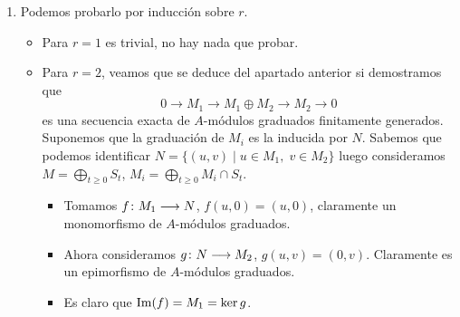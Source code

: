 \documentclass[twoside]{article}
\begin{document}
\begin{solucion}
\begin{enumerate}
\begin{proof} Veamos que se verifican las propiedades.
\begin{itemize} 
\item $P_t,N_t$ y $M_t$ son $k$-e.v. de dimensión finita por el Lema \ref{lemma:1}.
\item Las restricciones de $f$ y $g$ a $M_t$ y $N_t$ respectivamente están bien definidas por la hipótesis de que son homomorfismos de $A$-módulos graduados (Ecuación \ref{eq:1}).
\item $f,g$ son homomorfismos de $k$-e.v. por ser homomorfismos de $A$-módulos, luego las restricciones también lo son. Además, $f$ es inyectiva por hipótesis, por lo que $f|_{M_t}$ también lo es. $g|_{N_t}$ es sobreyectiva por el Lema \ref{lemma:2}.
\item Sabemos que $\Ima(f)=\ker g$. Es claro que $\Ima(f|_{M_t})= \Ima(f)\cap N_t$. Una contención es trivial, sea $x\in \Ima(f)\cap N_t$, si no estuviese en $M_t$ podríamos razonar como en el Lema 2. Por definición, $\ker{g|_{N_t}}=\ker g \cap N_t$, luego
$$
\Ima(f|_{M_t})= \Ima(f)\cap N_t =\ker g \cap N_t = \ker{g|_{N_t}}
$$
\end{itemize}
\end{proof}
Una consecuencia inmediata del Lema \ref{lemma:3} es que $P_t \cong N_t/f(M_t)$, luego 
 $$
\dim_k(P_t) = \dim_k(N_t)-\dim_k(f(M_t)) \overset{\text{f inyectiva}}{=} \dim_k(N_t)-\dim_k(M_t)
$$
$$\phi_P(t) = \phi_N(t)-\phi_M(t) \Rightarrow \phi_N(t)=\phi_M(t)+\phi_P(t)$$
\item Podemos probarlo por inducción sobre $r$. 
\begin{itemize}
\item Para $r=1$ es trivial, no hay nada que probar. 
\item Para $r=2$, veamos que se deduce del apartado anterior si demostramos que 
$$
0\to M_1 \to M_1 \oplus M_2 \to M_2 \to 0$$
es una secuencia exacta de $A$-módulos graduados finitamente generados. Suponemos que la graduación de $M_i$ es la inducida por $N$. Sabemos que podemos identificar $N = \{(u,v)\mid u\in M_1,\;v\in M_2\}$ luego consideramos $M=\bigoplus_{t\geq 0} S_t$, $M_i = \bigoplus_{t\geq 0} M_i \cap S_t$.
\begin{itemize}
\item Tomamos $f\colon{M_1}\longrightarrow{N}$, $f(u,0)=(u,0)$, claramente un monomorfismo de $A$-módulos graduados. 
\item Ahora consideramos $g\colon{N}\longrightarrow{M_2}$, $g(u,v)=(0,v)$. Claramente es un epimorfismo de $A$-módulos graduados. 
\item Es claro que $\operatorname{Im}(f)=M_1 = \ker g$.

\end{itemize}
\end{itemize}
\end{enumerate}
\end{solucion}
\end{document}
